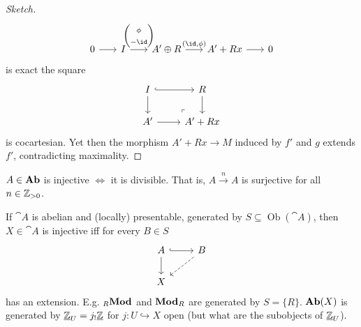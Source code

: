 \documentclass[../main.tex]{subfiles}
\begin{document}
\begin{proof}[Sketch]
\[\begin{tikzcd}[column sep=scriptsize]
        0 \ar[r] & I \ar[r, "\begin{pmatrix} \phi \\ -\id\end{pmatrix}"] & A'\oplus R \ar[r, "{(\id, \phi)}"] &A' + Rx \ar[r] & 0
    \end{tikzcd}\]
    is exact the square
\[\begin{tikzcd}
	I & R \\
	{A'} & {A' + Rx}
	\arrow[hook, from=1-1, to=1-2]
	\arrow[from=1-1, to=2-1]
	\arrow[from=1-2, to=2-2]
	\arrow[from=2-1, to=2-2]
	\arrow["\lrcorner"{anchor=center, pos=0.125, rotate=180}, draw=none, from=2-2, to=1-1]
\end{tikzcd}\] is cocartesian. Yet then the morphism $A' + Rx \to M$ induced by $f'$ and $g$ extends $f'$, contradicting maximality.
\end{proof}

\begin{exc}[Homework 6]
    $A\in \mathbf{Ab}$ is injective $\iff$ it is divisible. That is, $A\xrightarrow{n} A$ is surjective for all $n\in \mathbb{Z}_{>0}$.
\end{exc}

\begin{rmk}
    If $\cat A$ is abelian and (locally) presentable, generated by $S\subseteq \operatorname{Ob}(\cat A)$, then $X\in\cat A$ is injective iff for every $B\in S$ 
\[\begin{tikzcd}
	A & B \\
	X
	\arrow[hook, from=1-1, to=1-2]
	\arrow[from=1-1, to=2-1]
	\arrow[dashed, from=1-2, to=2-1]
\end{tikzcd}\] has an extension. E.g. $_R\catModule$ and $\catModule[R]$ are generated by $S = \{R\}$. $\mathbf{Ab}(X)$ is generated by $\underline{\mathbb{Z}}_U = j_{!}\underline{\mathbb{Z}}$ for $j\colon U\hookrightarrow X$ open (but what are the subobjects of $\underline{\mathbb{Z}}_U$). 
\end{rmk}
\end{document}
